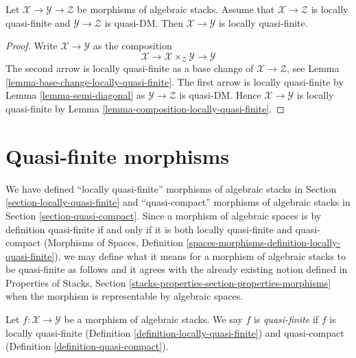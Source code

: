 \begin{lemma}
\label{lemma-locally-quasi-finite-permanence}
Let $\mathcal{X} \to \mathcal{Y} \to \mathcal{Z}$ be morphisms
of algebraic stacks. Assume that $\mathcal{X} \to \mathcal{Z}$
is locally quasi-finite and $\mathcal{Y} \to \mathcal{Z}$ is quasi-DM.
Then $\mathcal{X} \to \mathcal{Y}$ is locally quasi-finite.
\end{lemma}

\begin{proof}
Write $\mathcal{X} \to \mathcal{Y}$ as the composition
$$
\mathcal{X} \longrightarrow
\mathcal{X} \times_\mathcal{Z} \mathcal{Y} \longrightarrow
\mathcal{Y}
$$
The second arrow is locally quasi-finite as a base change of
$\mathcal{X} \to \mathcal{Z}$, see
Lemma \ref{lemma-base-change-locally-quasi-finite}.
The first arrow is locally quasi-finite by
Lemma \ref{lemma-semi-diagonal}
as $\mathcal{Y} \to \mathcal{Z}$ is quasi-DM.
Hence $\mathcal{X} \to \mathcal{Y}$ is locally quasi-finite by
Lemma \ref{lemma-composition-locally-quasi-finite}.
\end{proof}

















\section{Quasi-finite morphisms}
\label{section-quasi-finite}

\noindent
We have defined ``locally quasi-finite'' morphisms of algebraic stacks
in Section \ref{section-locally-quasi-finite} and ``quasi-compact'' morphisms
of algebraic stacks in Section \ref{section-quasi-compact}. Since a morphism
of algebraic spaces is by definition quasi-finite if and only if it is both
locally quasi-finite and quasi-compact (Morphisms of Spaces, Definition
\ref{spaces-morphisms-definition-locally-quasi-finite}),
we may define what it means for a morphism of algebraic stacks to be
quasi-finite as follows and it agrees with the already existing notion defined
in Properties of Stacks,
Section \ref{stacks-properties-section-properties-morphisms}
when the morphism is representable by algebraic spaces.

\begin{definition}
\label{definition-quasi-finite}
\begin{reference}
\cite{rydh_approx}
\end{reference}
Let $f : \mathcal{X} \to \mathcal{Y}$ be a morphism of algebraic stacks.
We say $f$ is {\it quasi-finite} if $f$ is locally quasi-finite
(Definition \ref{definition-locally-quasi-finite})
and quasi-compact (Definition \ref{definition-quasi-compact}).
\end{definition}

